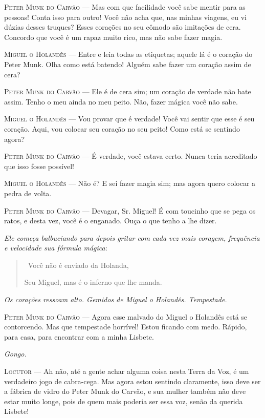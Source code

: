 \begin{myparindent}{0pt}
\begin{Parskip}
\textsc{Peter Munk do Carvão} --- Mas com que facilidade você sabe mentir para as
pessoas! Conta isso para outro! Você não acha que, nas minhas viagens,
eu vi dúzias desses truques? Esses corações no seu cômodo são imitações
de cera. Concordo que você é um rapaz muito rico, mas não sabe fazer
magia.

\textsc{Miguel o Holandês} --- Entre e leia todas as etiquetas; aquele lá é o
coração do Peter Munk. Olha como está batendo! Alguém sabe fazer um
coração assim de cera?

\textsc{Peter Munk do Carvão} --- Ele é de cera sim; um coração de verdade não
bate assim. Tenho o meu ainda no meu peito. Não, fazer mágica você não
sabe.

\textsc{Miguel o Holandês} --- Vou provar que é verdade! Você vai sentir que esse
é seu coração. Aqui, vou colocar seu coração no seu peito! Como está se
sentindo agora?

\textsc{Peter Munk do Carvão} --- É verdade, você estava certo. Nunca teria
acreditado que isso fosse possível!

\textsc{Miguel o Holandês} --- Não é? E sei fazer magia sim; mas agora quero
colocar a pedra de volta.

\textsc{Peter Munk do Carvão} --- Devagar, Sr. Miguel! É com toucinho que se pega
os ratos, e desta vez, você é o enganado. Ouça o que tenho a lhe dizer.

\emph{Ele começa balbuciando para depois gritar com cada vez mais
coragem, frequência e velocidade sua fórmula mágica}:

\begin{quote}
\quad \, Você não é enviado da Holanda,

Seu Miguel, mas é o inferno que lhe manda.
\end{quote}

\emph{Os corações ressoam alto. Gemidos de Miguel o Holandês.
Tempestade.}

\textsc{Peter Munk do Carvão} --- Agora esse malvado do Miguel o Holandês está se
contorcendo. Mas que tempestade horrível! Estou ficando com medo.
Rápido, para casa, para encontrar com a minha Lisbete.

\emph{Gongo.}

\textsc{Locutor} --- Ah não, até a gente achar alguma coisa nesta Terra da Voz, é
um verdadeiro jogo de cabra-cega. Mas agora estou sentindo claramente,
isso deve ser a fábrica de vidro do Peter Munk do Carvão, e sua mulher
também não deve estar muito longe, pois de quem mais poderia ser essa
voz, senão da querida Lisbete!


\end{Parskip}
\end{myparindent}
